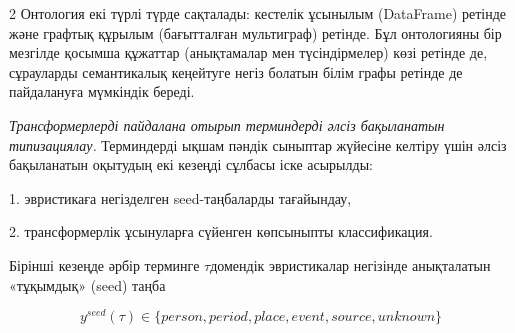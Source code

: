 \begin{multicols}{2}
Онтология екі түрлі түрде сақталады: кестелік ұсынылым (DataFrame)
ретінде және графтық құрылым (бағытталған мультиграф) ретінде. Бұл
онтологияны бір мезгілде қосымша құжаттар (анықтамалар мен
түсіндірмелер) көзі ретінде де, сұрауларды семантикалық кеңейтуге негіз
болатын білім графы ретінде де пайдалануға мүмкіндік береді.

\emph{Трансформерлерді пайдалана отырып терминдерді әлсіз бақыланатын
типизациялау.} Терминдерді ықшам пәндік сыныптар жүйесіне келтіру үшін
әлсіз бақыланатын оқытудың екі кезеңді сұлбасы іске асырылды:

1. эвристикаға негізделген seed-таңбаларды тағайындау,

2. трансформерлік ұсынуларға сүйенген көпсыныпты классификация.

Бірінші кезеңде әрбір терминге \(\tau\)домендік эвристикалар негізінде
анықталатын «тұқымдық» (seed) таңба
\end{multicols}
\vspace{-1em}
\[y^{seed}(\tau) \in \{person,period,place,event,source,unknown\}\]

